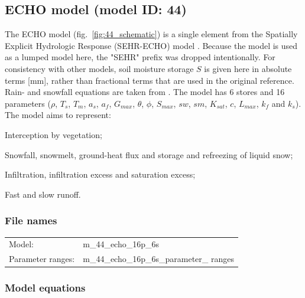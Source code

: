 \subsection{ECHO model (model ID: 44)}
The ECHO model (fig.~\ref{fig:44_schematic}) is a single element from the Spatially Explicit Hydrologic Response (SEHR-ECHO) model \citep{Schaefli2014}. Because the model is used as a lumped model here, the "SEHR" prefix was dropped intentionally. For consistency with other models, soil moisture storage $S$ is given here in absolute terms [mm], rather than fractional terms that are used in the original reference. Rain- and snowfall equations are taken from \citet{Schaefli2005}. The model has 6 stores and 16 parameters ($\rho$, $T_s$, $T_m$, $a_s$, $a_f$, $G_{max}$, $\theta$, $\phi$, $S_{max}$, $sw$, $sm$, $K_{sat}$, $c$, $L_{max}$, $k_f$ and $k_s$). The model aims to represent:

\begin{itemizecompact}
\item Interception by vegetation;
\item Snowfall, snowmelt, ground-heat flux and storage and refreezing of liquid snow;
\item Infiltration, infiltration excess and saturation excess;
\item Fast and slow runoff.
\end{itemizecompact}

\subsubsection{File names}
\begin{tabular}{@{}ll}
Model: &m\_44\_echo\_16p\_6s \\
Parameter ranges: &m\_44\_echo\_16p\_6s\_parameter\_ ranges \\
\end{tabular}

\subsubsection{Model equations}

